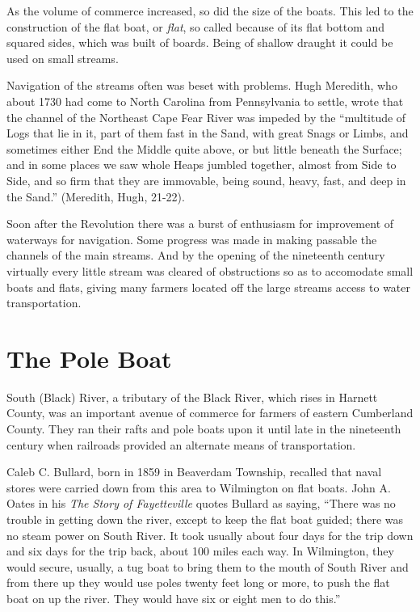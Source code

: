 \documentclass[11pt, a5paper, openright]{book}
\begin{document}
As the volume of commerce increased, so did the size of the boats.
This led to the construction of the flat boat, or \textit{flat}, so
called because of its flat bottom and squared sides, which was built
of boards.  Being of shallow draught it could be used on small
streams.\par

Navigation of the streams often was beset with problems.  Hugh
Meredith, who about 1730 had come to North Carolina from Pennsylvania
to settle, wrote that the channel of the Northeast Cape Fear River was
impeded by the ``multitude of Logs that lie in it, part of them fast in
the Sand, with great Snags or Limbs, and sometimes either End the
Middle quite above, or but little beneath the Surface; and in some
places we saw whole Heaps jumbled together, almost from Side to Side,
and so firm that they are immovable, being sound, heavy, fast, and
deep in the Sand.'' (Meredith, Hugh, 21-22).\par %

Soon after the Revolution there was a burst of enthusiasm for
improvement of waterways for navigation.  Some progress was made in
making passable the channels of the main streams.  And by the opening
of the nineteenth century virtually every little stream was cleared of
obstructions so as to accomodate small boats and flats, giving many
farmers located off the large streams access to water
transportation.\par

\section{The Pole Boat}

South (Black) River, a tributary of the Black River, which rises in
Harnett County, was an important avenue of commerce for farmers of
eastern Cumberland County.  They ran their rafts and pole boats upon
it until late in the nineteenth century when railroads provided an
alternate means of transportation.\par

Caleb C. Bullard, born in 1859 in Beaverdam Township, recalled that
naval stores were carried down from this area to Wilmington on flat
boats.  John A. Oates in his \textit{The Story of Fayetteville} quotes
Bullard as saying, ``There was no trouble in getting down the river,
except to keep the flat boat guided; there was no steam power on South
River.  It took usually about four days for the trip down and six days
for the trip back, about 100 miles each way.  In Wilmington, they
would secure, usually, a tug boat to bring them to the mouth of South
River and from there up they would use poles twenty feet long or more,
to push the flat boat on up the river.  They would have six or eight
men to do this.''\par
\end{document}
